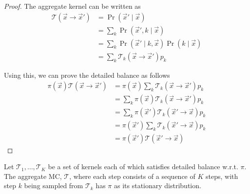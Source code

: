 \begin{proof}
    The aggregate kernel can be written as
    \begin{align}
        \mathcal T(\vec x \to \vec x')  &= \Pr(\vec x' \mid \vec x) \\
                                        &= \sum_k \Pr(\vec x', k \mid \vec x) \\
                                        &= \sum_k \Pr(\vec x' \mid k, \vec x) \Pr(k \mid \vec x) \\
                                        &= \sum_k \mathcal T_k(\vec x \to \vec x') p_k
    \end{align}

    Using this, we can prove the detailed balance as follows
    \begin{align}
        \pi(\vec x)\mathcal T(\vec x \to \vec x')   &= \pi(\vec x) \sum_k \mathcal T_k(\vec x \to \vec x') p_k \\
                                                    &= \sum_k \pi(\vec x) \mathcal T_k(\vec x \to \vec x') p_k \\
                                                    &= \sum_k \pi(\vec x') \mathcal T_k(\vec x' \to \vec x) p_k \\
                                                    &= \pi(\vec x') \sum_k \mathcal T_k(\vec x' \to \vec x) p_k \\
                                                    &= \pi(\vec x') \mathcal T(\vec x' \to \vec x)
    \end{align}
\end{proof}

\begin{proposition}
    \label{proposition:seq}
    Let $\mathcal T_1, \dotsc, \mathcal T_K$ be a set of kernels each of which satisfies detailed balance w.r.t. $\pi$. The aggregate MC, $\mathcal T$, where each step consists of a sequence of $K$ steps, with step $k$ being sampled from $\mathcal T_k$ has $\pi$ as its stationary distribution.
\end{proposition}

